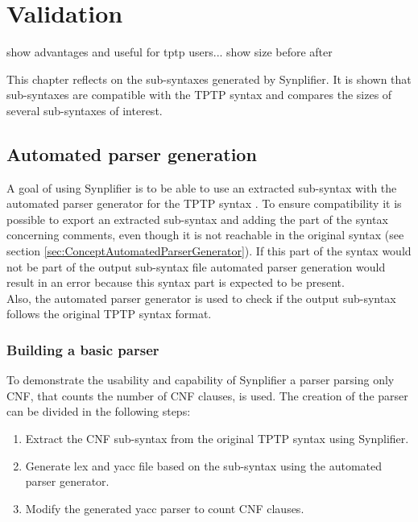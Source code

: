 \chapter{Validation}\label{sec:Validation}

show advantages and useful for tptp users...
show size before after 

This chapter reflects on the sub-syntaxes generated by \ac{Synplifier}. It is shown that sub-syntaxes are compatible with the \ac{TPTP} syntax and compares the sizes of several sub-syntaxes of interest.

%

\section{Automated parser generation}\label{sec:ValidationAutomatedParserGeneration}

A goal of using \ac{Synplifier} is to be able to use an extracted sub-syntax with the automated parser generator for the \ac{TPTP} syntax \cite{VS06}.
To ensure compatibility it is possible to export an extracted sub-syntax and adding the part of the syntax concerning comments, even though it is not reachable in the original syntax (see section \ref{sec:ConceptAutomatedParserGenerator}). If this part of the syntax would not be part of the output sub-syntax file automated parser generation would result in an error because this syntax part is expected to be present.\\
Also, the automated parser generator is used to check if the output sub-syntax follows the original \ac{TPTP} syntax format.

\subsection{Building a basic parser}\label{sec:ValidationAutomatedParserGenerationBuildingBasicParser}

To demonstrate the usability and capability of \ac{Synplifier} a parser parsing only \ac{CNF}, that counts the number of \ac{CNF} clauses, is used.
The creation of the parser can be divided in the following steps:
\begin{enumerate}%
	\item Extract the \ac{CNF} sub-syntax from the original \ac{TPTP} syntax using \ac{Synplifier}.
	\item Generate lex and yacc file based on the sub-syntax using the automated parser generator.
	\item Modify the generated yacc parser to count \ac{CNF} clauses.
\end{enumerate}


